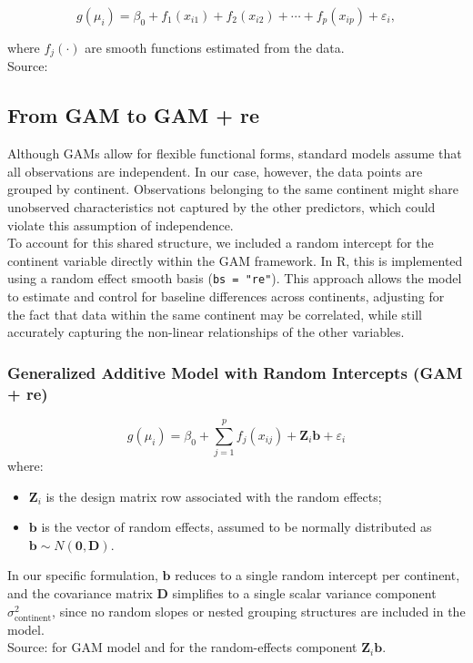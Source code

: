 \begin{equation}
g(\mu_i)=
\beta_0+
f_1(x_{i1})+
f_2(x_{i2})+
\cdots+
f_p(x_{ip}) +
\varepsilon_i,
\end{equation}

where $f_j(\cdot)$ are smooth functions estimated from the data.\\
\small Source: \textcite[p.~307]{james2021islr}

\subsection{From GAM to GAM + re}
Although GAMs allow for flexible functional forms, standard models assume that 
all observations are independent. In our case, however, the data points are 
grouped by continent. Observations belonging to the same continent might share unobserved characteristics 
not captured by the other predictors, which could violate this assumption of 
independence.\\
To account for this shared structure, we included a random intercept for the 
continent variable directly within the GAM framework. In R, this is implemented 
using a random effect smooth basis (\texttt{bs = "re"}). This approach allows 
the model to estimate and control for baseline differences across continents, 
adjusting for the fact that data within the same continent may be correlated, 
while still accurately capturing the non-linear relationships of the other 
variables.

\subsubsection{Generalized Additive Model with Random Intercepts (GAM + re)}
\begin{equation}
g(\mu_i) = \beta_0 + \sum_{j=1}^{p}f_j(x_{ij}) + \mathbf{Z}_i\mathbf{b} + \varepsilon_i
\end{equation}
where:
\begin{itemize}
    \item $\mathbf{Z}_i$ is the design matrix row associated with the random effects;
    \item $\mathbf{b}$ is the vector of random effects, assumed to be normally distributed as $\mathbf{b} \sim N(\mathbf{0}, \mathbf{D})$.
\end{itemize}
In our specific formulation, $\mathbf{b}$ reduces to a single random intercept per 
continent, and the covariance matrix $\mathbf{D}$ simplifies to a single scalar 
variance component $\sigma^2_{\text{continent}}$, since no random slopes or nested 
grouping structures are included in the model.\\
\small Source: \textcite[p.~307]{james2021islr} for GAM model and \textcite[p.~105]{zuur2009mixed_effects_models} for the random-effects component $\mathbf{Z}_i\mathbf{b}$.


